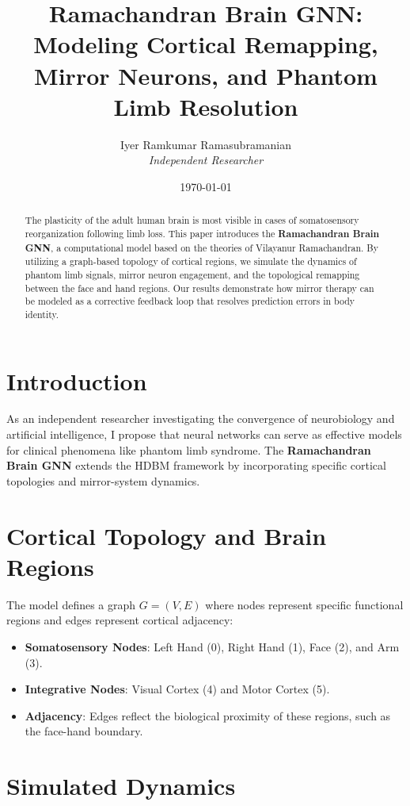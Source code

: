\documentclass[12pt]{article}
\title{\textbf{Ramachandran Brain GNN: \\ Modeling Cortical Remapping, Mirror Neurons, and Phantom Limb Resolution}}
\author{Iyer Ramkumar Ramasubramanian \\ \textit{Independent Researcher}}
\date{\today}
\begin{document}
\maketitle

\begin{abstract}
The plasticity of the adult human brain is most visible in cases of somatosensory reorganization following limb loss. This paper introduces the \textbf{Ramachandran Brain GNN}, a computational model based on the theories of Vilayanur Ramachandran. By utilizing a graph-based topology of cortical regions, we simulate the dynamics of phantom limb signals, mirror neuron engagement, and the topological remapping between the face and hand regions. Our results demonstrate how mirror therapy can be modeled as a corrective feedback loop that resolves prediction errors in body identity.
\end{abstract}

\section{Introduction}
As an independent researcher investigating the convergence of neurobiology and artificial intelligence, I propose that neural networks can serve as effective models for clinical phenomena like phantom limb syndrome. The \textbf{Ramachandran Brain GNN} extends the HDBM framework by incorporating specific cortical topologies and mirror-system dynamics.

\section{Cortical Topology and Brain Regions}

The model defines a graph $G = (V, E)$ where nodes represent specific functional regions and edges represent cortical adjacency:

\begin{itemize}
\item \textbf{Somatosensory Nodes}: Left Hand (0), Right Hand (1), Face (2), and Arm (3).
\item \textbf{Integrative Nodes}: Visual Cortex (4) and Motor Cortex (5).
\item \textbf{Adjacency}: Edges reflect the biological proximity of these regions, such as the face-hand boundary.
\end{itemize}

\section{Simulated Dynamics}
\end{document}
